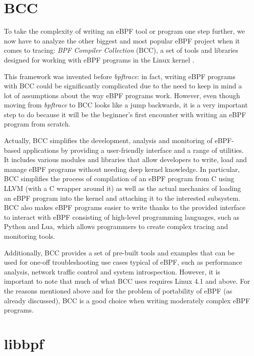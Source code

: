 \section{BCC}

To take the complexity of writing an eBPF tool or program one step further, we now have to analyze the other biggest and most popular eBPF project when it comes to tracing: \textit{BPF Compiler Collection} (BCC), a set of tools and libraries designed for working with eBPF programs in the Linux kernel \cite{BCCRepo}.

This framework was invented before \textit{bpftrace}: in fact, writing eBPF programs with BCC could be significantly complicated due to the need to keep in mind a lot of assumptions about the way eBPF programs work.
However, even though moving from \textit{bpftrace} to BCC looks like a jump backwards, it is a very important step to do because it will be the beginner's first encounter with writing an eBPF program from scratch.
 
Actually, BCC simplifies the development, analysis and monitoring of eBPF-based applications by providing a user-friendly interface and a range of utilities. 
It includes various modules and libraries that allow developers to write, load and manage eBPF programs without needing deep kernel knowledge. 
In particular, BCC simplifies the process of compilation of an eBPF program from C using LLVM (with a C wrapper around it) as well as the actual mechanics of loading an eBPF program into the kernel and attaching it to the interested subsystem.
BCC also makes eBPF programs easier to write thanks to the provided interface to interact with eBPF consisting of high-level programming languages, such as Python and Lua, which allows programmers to create complex tracing and monitoring tools.

Additionally, BCC provides a set of pre-built tools and examples that can be used for one-off troubleshooting use cases typical of eBPF, such as performance analysis, network traffic control and system introspection.
However, it is important to note that much of what BCC uses requires Linux 4.1 and above.
For the reasons mentioned above and for the problem of portability of eBPF (as already discussed), BCC is a good choice when writing moderately complex eBPF programs.

\section{libbpf}

